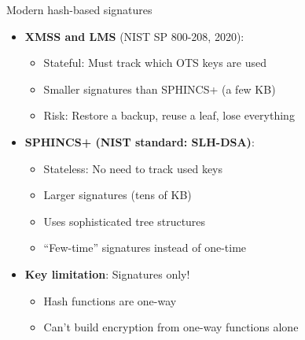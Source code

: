 \ifdefined\PRESENTATION\else\PassOptionsToClass{handout}{beamer}\fi\documentclass[aspectratio=169, lualatex]{beamer}
\begin{document}
\begin{frame}{Modern hash-based signatures}
	\begin{itemize}
		\item \textbf{XMSS and LMS} (NIST SP 800-208, 2020):
		      \begin{itemize}
			      \item Stateful: Must track which OTS keys are used
			      \item Smaller signatures than SPHINCS+ (a few KB)
			      \item Risk: Restore a backup, reuse a leaf, lose everything
		      \end{itemize}
		\item \textbf{SPHINCS+ (NIST standard: SLH-DSA)}:
		      \begin{itemize}
			      \item Stateless: No need to track used keys
			      \item Larger signatures (tens of KB)
			      \item Uses sophisticated tree structures
			      \item ``Few-time'' signatures instead of one-time
		      \end{itemize}
		\item \textbf{Key limitation}: Signatures only!
		      \begin{itemize}
			      \item Hash functions are one-way
			      \item Can't build encryption from one-way functions alone
		      \end{itemize}
	\end{itemize}
\end{frame}
\end{document}
